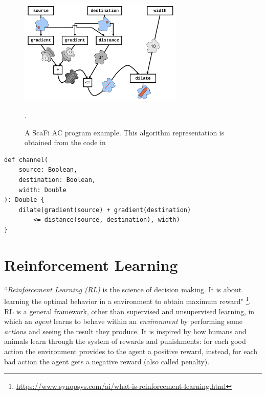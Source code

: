 \documentclass[12pt,a4paper,openright,twoside]{book}
\begin{document}
\begin{figure}[h!]
    \centering
    \includegraphics[width=0.7\textwidth]{figures/channel.png}
    \caption{A ScaFi AC program example. This algorithm representation is obtained from the code in }.
    \label{fig:channel}
\end{figure}

\begin{lstlisting}[caption={A ScaFi AC program example. The algorithm implements a channel between a source and a destination.}, label={lst:channel}]
def channel(
    source: Boolean, 
    destination: Boolean, 
    width: Double
): Double {
    dilate(gradient(source) + gradient(destination) 
        <= distance(source, destination), width)
}
\end{lstlisting}

%
\section{Reinforcement Learning}
%

``\emph{Reinforcement Learning (RL)} is the science of decision making. It is about learning the optimal behavior 
    in a environment to obtain maximum reward" 
    \footnote{\url{https://www.synopsys.com/ai/what-is-reinforcement-learning.html}}.
    RL is a general framework, other than supervised and unsupervised learning, in which an \emph{agent} learns 
    to behave within an \emph{environment} by performing some \emph{actions} and seeing the result they produce.
    It is inspired by how humans and animals learn through the system of rewards and punishments: for each good action
    the environment provides to the agent a positive reward, instead, for each bad action the agent gets a negative 
    reward (also called penalty).
\end{document}
